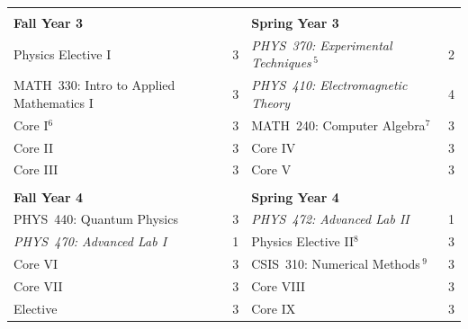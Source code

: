 \documentclass[12pt]{article}
\begin{document}
\begin{table}[h!]
\begin{center}
{\renewcommand{\arraystretch}{1.2}
\begin{tabular*}{0.9\textwidth}{@{\extracolsep{\fill}}lclc} & \\
{\Large \textbf{Fall Year 3}} & & {\Large \textbf{Spring Year 3}} & \\
\hline
Physics Elective I        					& 3 & {\em PHYS~370: Experimental Techniques}\,$^{5}$  		& 2 \\
MATH~330: Intro to Applied Mathematics I 	& 3 & {\em PHYS~410: Electromagnetic Theory} 				& 4 \\
Core I$^{6}$                   				& 3 & MATH~240: Computer Algebra$^{7}$   					& 3 \\
Core II 									& 3 & Core IV 												&3  \\
Core III 									& 3 & Core V 												&3  \\
 & \\ 
{\Large \textbf{Fall Year 4}} & & {\Large \textbf{Spring Year 4}} & \\
\hline
PHYS~440: Quantum Physics 					& 3 & {\em PHYS~472: Advanced Lab II}  						& 1 \\
{\em PHYS~470: Advanced Lab I}       		& 1 & Physics Elective II$^{8}$        						& 3 \\
Core VI                       				& 3 & CSIS~310: Numerical Methods\,$^{9}$ 					& 3 \\
Core VII                      				& 3 & Core VIII 											& 3 \\
Elective                     				& 3 & Core IX  												& 3 \\
\hline


\end{tabular*}
}
\end{center}
\end{table}
\end{document}
